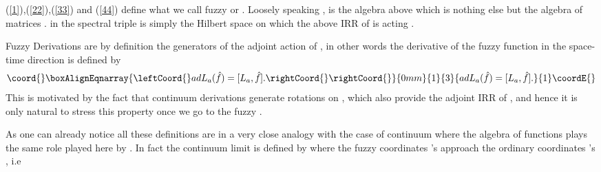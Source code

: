 \documentclass[a4paper,10pt]{article}
\begin{document}
(\ref{1}),(\ref{22}),(\ref{33}) and (\ref{44}) define what we call
fuzzy \coordHE{} or \coordHE{}. Loosely speaking , \coordHE{} is the algebra \coordHE{} above which is nothing else but
the algebra \coordHE{} of \coordHE{} matrices .
\coordHE{} in the spectral triple \coordHE{} is simply
the Hilbert space on which the above IRR \coordHE{} of \coordHE{} is acting
.

Fuzzy Derivations are by definition the generators of the adjoint
action of \coordHE{} , in other words the derivative of the fuzzy
function \coordHE{} in the space-time direction \coordHE{} is
\coordHE{} defined by
\begin{eqnarray}\coord{}\boxAlignEqnarray{\leftCoord{}
adL_a(\hat{f})=[L_a,\hat{f}].\rightCoord{}
\rightCoord{}}{0mm}{1}{3}{
adL_a(\hat{f})=[L_a,\hat{f}].
}{1}\coordE{}\end{eqnarray}
This is motivated by the fact that continuum derivations \coordHE{} generate rotations on
\coordHE{} , which also provide the adjoint IRR of \coordHE{} , and
hence it is only natural to stress this property once we go to
the fuzzy .

As one can already notice all these definitions are in a very close analogy with the case of continuum \coordHE{}
where the algebra of functions \coordHE{} plays the same role played here by \coordHE{}. In fact the continuum limit
is defined by \coordHE{} where the fuzzy coordinates \coordHE{}'s approach the ordinary coordinates
\coordHE{}'s , i.e
\end{document}
